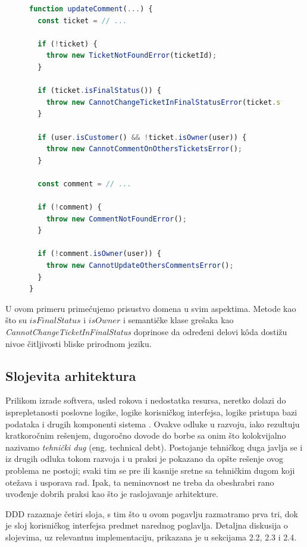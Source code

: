 \documentclass[12pt,oneside]{memoir}
\begin{document}
\begin{figure}[h]
\begin{lstlisting}[language=JavaScript, style=ES6, caption={K\^{o}d koji je na domenskom jeziku}]
function updateComment(...) {
  const ticket = // ...

  if (!ticket) {
    throw new TicketNotFoundError(ticketId);
  }

  if (ticket.isFinalStatus()) {
    throw new CannotChangeTicketInFinalStatusError(ticket.status);
  }

  if (user.isCustomer() && !ticket.isOwner(user)) {
    throw new CannotCommentOnOthersTicketsError();
  }

  const comment = // ...

  if (!comment) {
    throw new CommentNotFoundError();
  }

  if (!comment.isOwner(user)) {
    throw new CannotUpdateOthersCommentsError();
  }
}
\end{lstlisting}
\end{figure}

\newpage
U ovom primeru primećujemo prisustvo domena u svim aspektima. Metode kao što su $isFinalStatus$ i $isOwner$ i semantičke klase grešaka kao \textit{CannotChangeTicketInFinalStatus} doprinose da određeni delovi k\^{o}da dostižu nivoe čitljivosti bliske prirodnom jeziku.

\subsection{Slojevita arhitektura}
Prilikom izrade softvera, usled rokova i nedostatka resursa, neretko dolazi do isprepletanosti poslovne logike, logike korisničkog interfejsa, logike pristupa bazi podataka i drugih komponenti sistema \cite{dddfull}. Ovakve odluke u razvoju, iako rezultuju kratkoročnim rešenjem, dugoročno dovode do borbe sa onim što kolokvijalno nazivamo \textit{tehnički dug} (eng. technical debt). Postojanje tehničkog duga javlja se i iz drugih odluka tokom razvoja i u praksi je pokazano da opšte rešenje ovog problema ne postoji; svaki tim se pre ili kasnije sretne sa tehničkim dugom koji otežava i usporava rad. Ipak, ta neminovnost ne treba da obeshrabri rano uvođenje dobrih praksi kao što je raslojavanje arhitekture. 

DDD razaznaje četiri sloja, s tim što u ovom pogavlju razmatramo prva tri, dok je sloj korisničkog interfejsa predmet narednog poglavlja. Detaljna diskusija o slojevima, uz relevantnu implementaciju, prikazana je u sekcijama 2.2, 2.3 i 2.4.
\end{document}

